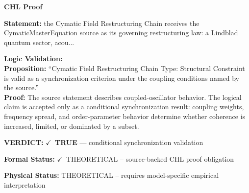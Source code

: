 \vspace{0.45em}
\noindent\textbf{CHL Proof}\par
\textbf{Statement:} the Cymatic Field Restructuring Chain receives the CymaticMasterEquation source as its
governing restructuring law: a Lindblad quantum sector, acou...

\textbf{Logic Validation:}\\
\textbf{Proposition:} ``Cymatic Field Restructuring Chain Type: Structural Constraint is valid as a
synchronization criterion under the coupling conditions named by the source.''\\
\textbf{Proof:} The source statement describes coupled-oscillator behavior. The logical claim is
accepted only as a conditional synchronization result: coupling weights, frequency
spread, and order-parameter behavior determine whether coherence is increased, limited,
or dominated by a subset.

\textbf{VERDICT:} \ensuremath{\checkmark}\ \textbf{TRUE} --- conditional synchronization validation

\textbf{Formal Status:} \ensuremath{\checkmark}\ THEORETICAL -- source-backed CHL proof obligation

\textbf{Physical Status:} THEORETICAL -- requires model-specific empirical interpretation
\par\vspace{0.45em}
\par
\ifTZPDarkEdition
{}
\fi
\endgroup
\endgroup
